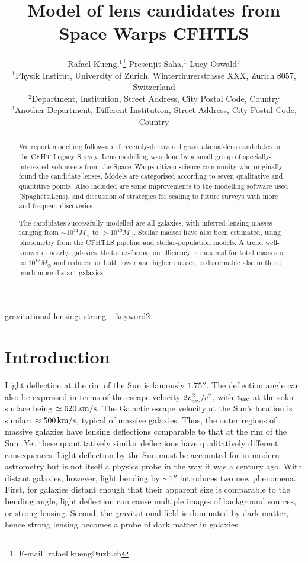 \documentclass[fleqn,usenatbib]{mnras}
\title[Short title, max. 45 characters]{Model of lens candidates from
  Space Warps CFHTLS}
\author[R. Kueng et al.]{
Rafael Kueng,$^{1}$\thanks{E-mail: rafael.kueng@uzh.ch}
Presenjit Saha,$^{1}$
Lucy Oswald$^{3}$
\\
$^{1}$Physik Institut, University of Zurich, Winterthurerstrasse XXX, Zurich 8057, Switzerland\\
$^{2}$Department, Institution, Street Address, City Postal Code, Country\\
$^{3}$Another Department, Different Institution, Street Address, City Postal Code, Country
}
\begin{document}
\label{firstpage}
\pagerange{\pageref{firstpage}--\pageref{lastpage}}
\maketitle

\begin{abstract}
We report modelling follow-up of recently-discovered
gravitational-lens candidates in the CFHT Legacy Survey.  Lens
modelling was done by a small group of specially-interested volunteers
from the Space~Warps citizen-science community who originally found
the candidate lenses.  Models are categorised according to seven
qualitative and quantitive points.  Also included are some
improvements to the modelling software used (SpaghettiLens),
and discussion of strategies for scaling to future surveys
with more and frequent discoveries.

The candidates successfully modelled are all galaxies, with inferred
lensing masses ranging from $\sim10^{11}M_\odot$ to $>10^{13}M_\odot$.
Stellar masses have also been estimated, using photometry from the
CFHTLS pipeline and stellar-population models.  A trend well-known
in nearby galaxies, that star-formation efficiency is maximal for
total masses of $\approx10^{12}M_\odot$ and reduces for both lower and
higher masses, is discernable also in these much more distant
galaxies.
\end{abstract}

\begin{keywords}
gravitational lensing: strong -- keyword2
\end{keywords}

\section{Introduction}

Light deflection at the rim of the Sun is famously $1.75''$.  The
deflection angle can also be expressed in terms of the escape velocity
$2v_{\rm esc}^2/c^2$, with $v_{\rm esc}$ at the solar surface being
$\simeq620\rm\,km/s$.  The Galactic escape velocity at the Sun's
location is similar: $\approx500\rm\,km/s$, typical of massive
galaxies.  Thus, the outer regions of massive galaxies have lensing
deflections comparable to that at the rim of the Sun.  Yet these
quantitatively similar deflections have qualitatively different
consequences.  Light deflection by the Sun must be accounted for in
modern astrometry \citep[see e.g.,][]{2015CQGra..32p5008C} but is not
itself a physics probe in the way it was a century ago.  With distant
galaxies, however, light bending by $\sim1''$ introduces two new
phenomena.  First, for galaxies distant enough that their apparent
size is comparable to the bending angle, light deflection can cause
multiple images of background sources, or strong lensing.  Second, the
gravitational field is dominated by dark matter, hence strong lensing
becomes a probe of dark matter in galaxies.
\end{document}
